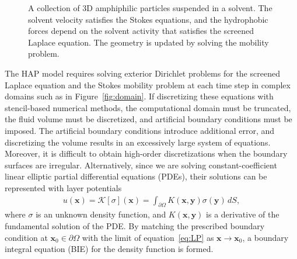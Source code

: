 \label{subsec:specific_aim_2}
\begin{figure}
    \vspace{-20pt}
    \caption{\label{fig:flow_map} \footnotesize A collection of 3D
    amphiphilic particles suspended in a solvent. The solvent velocity
    satisfies the Stokes equations, and the hydrophobic forces depend on
    the solvent activity that satisfies the screened Laplace equation.
    The geometry is updated by solving the mobility problem.} 
\end{figure}
The HAP model requires solving exterior Dirichlet problems for the
screened Laplace equation and the Stokes mobility problem at each time
step in complex domains such as in Figure~\ref{fig:domain}. If
discretizing these equations with stencil-based numerical methods, the
computational domain must be truncated, the fluid volume must be
discretized, and artificial boundary conditions must be imposed. The
artificial boundary conditions introduce additional error, and
discretizing the volume results in an excessively large system of
equations. Moreover, it is difficult to obtain high-order
discretizations when the boundary surfaces are irregular. Alternatively,
since we are solving constant-coefficient linear elliptic
partial differential equations (PDEs), their
solutions can be represented with layer potentials
\begin{align}
  \label{eq:LP}
  u(\mathbf{x}) = \mathcal{K}[\sigma](\mathbf{x}) = 
  \int_{\partial\Omega} K(\mathbf{x},\mathbf{y})
  \sigma(\mathbf{y})\,dS,
\end{align}
where $\sigma$ is an unknown density function, and
$K(\mathbf{x},\mathbf{y})$ is a derivative of the fundamental solution
of the PDE. By matching the prescribed boundary condition at
$\mathbf{x}_0 \in \partial\Omega$ with the limit of
equation~\eqref{eq:LP} as $\mathbf{x}\rightarrow \mathbf{x}_0$, a
boundary integral equation (BIE) for the density function is formed. 

